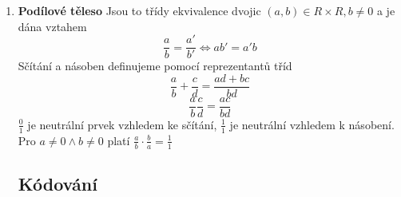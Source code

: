 \documentclass[12pt,a4paper]{article}
\begin{document}
\begin{enumerate}
			\item \textbf{Podílové těleso}
					Jsou to třídy ekvivalence dvojic $(a,b) \in R \times R, b \neq 0$ a je dána vztahem
					\[\frac{a}{b}=\frac{a'}{b'} \Leftrightarrow ab' = a'b\]
					Sčítání a násoben definujeme pomocí reprezentantů tříd
					\[\frac{a}{b}+\frac{c}{d} = \frac{ad + bc}{bd}  \]
					\[ \frac{a}{b}\frac{c}{d} = \frac{ac}{bd}\]
					$\frac{0}{1}$ je neutrální prvek vzhledem ke sčítání, $\frac{1}{1}$ je neutrální vzhledem k násobení.\\
					Pro $a \neq 0 \land b \neq 0$ platí $\frac{a}{b} \cdot \frac{b}{a} = \frac{1}{1}$
		\subsection{Kódování}
		
		
	
	\end{enumerate}
	
	
\end{document}
